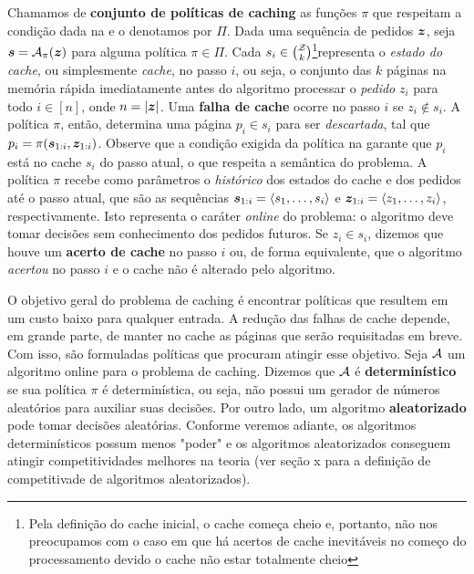 Chamamos de \textbf{conjunto de políticas de caching} as funções \(\pi\) que respeitam a condição dada na  e o denotamos por \(\Pi\). Dada uma sequência de pedidos \(\bm{z}\), seja \(\bm{s} = \mathcal{A}_\pi(\bm{z})\) para alguma política \(\pi \in \Pi\). Cada \(s_i \in \binom{\mathcal{Z}}{k}\)\footnote{Pela definição do cache inicial, o cache começa cheio e, portanto, não nos preocupamos com o caso em que há acertos de cache inevitáveis no começo do processamento devido o cache não estar totalmente cheio}representa o \emph{estado do cache}, ou simplesmente \emph{cache}, no passo \(i\), ou seja, o conjunto das \(k\) páginas na memória rápida imediatamente antes do algoritmo processar o \emph{pedido} \(z_i\) para todo \(i \in [n]\), onde \(n = |\bm{z}|\). Uma \textbf{falha de cache} ocorre no passo \(i\) se \(z_i \notin s_i\). A política \(\pi\), então, determina uma página \(p_i \in s_i\) para ser \emph{descartada}, tal que \(p_i = \pi(\bm{s}_{1:i}, \bm{z}_{1:i})\). Observe que a condição exigida da política na  garante que \(p_i\) está no cache \(s_i\) do passo atual, o que respeita a semântica do problema. A política \(\pi\) recebe como parâmetros o \emph{histórico} dos estados do cache e dos pedidos até o passo atual, que são as sequências \(\bm{s}_{1:i} = \langle s_1, \dotsc, s_i\rangle\) e \(\bm{z}_{1:i} = \langle z_1, \dotsc, z_i\rangle\), respectivamente. Isto representa o caráter \emph{online} do problema: o algoritmo deve tomar decisões sem conhecimento dos pedidos futuros. Se \(z_i \in s_i\), dizemos que houve um \textbf{acerto de cache} no passo \(i\) ou, de forma equivalente, que o algoritmo \emph{acertou} no passo \(i\) e o cache não é alterado pelo algoritmo.


O objetivo geral do problema de caching é encontrar políticas que resultem em um custo baixo para qualquer entrada. A redução das falhas de cache depende, em grande parte, de manter no cache as páginas que serão requisitadas em breve. Com isso, são formuladas políticas que procuram atingir esse objetivo. Seja \(\mathcal{A}\) um algoritmo online para o problema de caching. Dizemos que \(\mathcal{A}\) é \textbf{determinístico} se sua política \(\pi\) é determinística, ou seja, não possui um gerador de números aleatórios para auxiliar suas decisões. Por outro lado, um algoritmo \textbf{aleatorizado} pode tomar decisões aleatórias. Conforme veremos adiante, os algoritmos determinísticos possum menos "poder" e os algoritmos aleatorizados conseguem atingir competitividades melhores na teoria (ver seção x para a definição de competitivade de algoritmos aleatorizados). 



